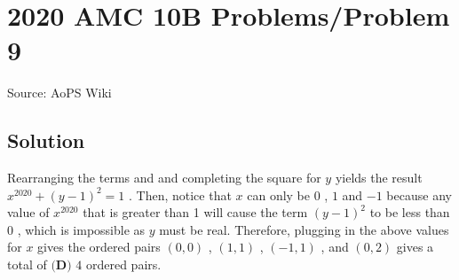 \documentclass[12pt]{article}
\begin{document}
\section*{{2020 AMC 10B Problems/Problem 9}}
Source: AoPS Wiki

\subsection*{Solution}
Rearranging the terms and and completing the square for $y$ yields the result $x^{2020}+(y-1)^2=1$ . Then, notice that $x$ can only be $0$ , $1$ and $-1$ because any value of $x^{2020}$ that is greater than 1 will cause the term $(y-1)^2$ to be less than $0$ , which is impossible as $y$ must be real. Therefore, plugging in the above values for $x$ gives the ordered pairs $(0,0)$ , $(1,1)$ , $(-1,1)$ , and $(0,2)$ gives a total of $\boxed{\textbf{(D) }4}$ ordered pairs.
\end{document}
